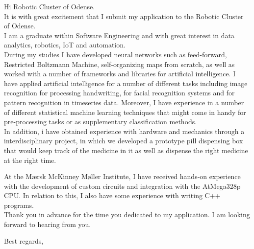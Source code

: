 \documentclass[10pt,a4paper]{altacv}
\begin{document}


\makecvheader



Hi Robotic Cluster of Odense.
\\
\vspace{5mm}
It is with great excitement that I submit my application to the Robotic Cluster of Odense.
\\
\vspace{5mm}
I am a graduate within Software Engineering and with great interest in data analytics, robotics, IoT and automation.
\\


During my studies I have developed neural networks such as feed-forward, Restricted Boltzmann Machine, self-organizing maps from scratch, as well as worked with a number of frameworks and libraries for artificial intelligence. 
I have applied artificial intelligence for a number of different tasks including image recognition for processing handwriting, for facial recognition systems and for pattern recognition in timeseries data.
Moreover, I have experience in a number of different statistical machine learning techniques that might come in handy for pre-processing tasks or as supplementary classification methods.
\\
In addition, i have obtained experience with hardware and mechanics through a interdisciplinary project, in which we developed a prototype pill dispensing box that would keep track of the medicine in it as well as dispense the right medicine at the right time.

At the Mærsk McKinney Møller Institute, I have received hands-on experience with the development of custom circuits and integration with the AtMega328p CPU.
In relation to this, I also have some experience with writing C++ programs.
\\
\vspace{5mm} 
Thank you in advance for the time you dedicated to my application. I am looking forward to hearing from you.


\vspace{5mm}
Best regards,\\
\end{document}
